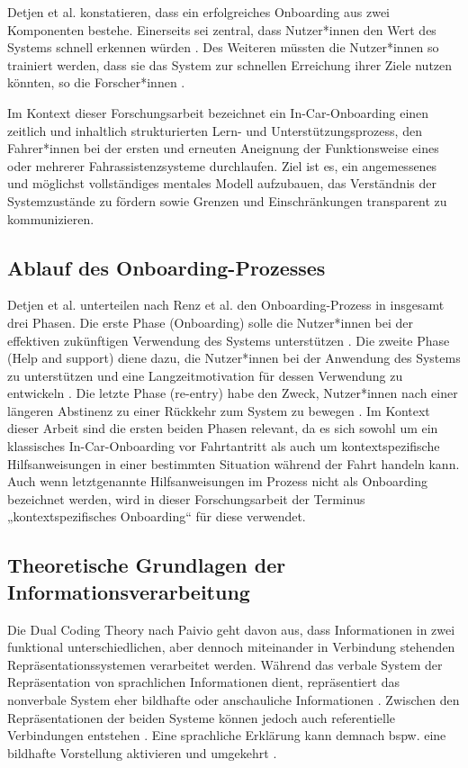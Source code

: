 Detjen et al. \cite{detjen2021supporting} konstatieren, dass ein erfolgreiches Onboarding aus zwei Komponenten bestehe. Einerseits sei zentral, dass Nutzer*innen den Wert des Systems schnell erkennen würden \cite{detjen2021supporting}. Des Weiteren müssten die Nutzer*innen so trainiert werden, dass sie das System zur schnellen Erreichung ihrer Ziele nutzen könnten, so die Forscher*innen \cite{detjen2021supporting}. 

Im Kontext dieser Forschungsarbeit bezeichnet ein In-Car-Onboarding einen zeitlich und inhaltlich strukturierten Lern- und Unterstützungsprozess, den Fahrer*innen bei der ersten und erneuten Aneignung der Funktionsweise eines oder mehrerer Fahrassistenzsysteme durchlaufen. Ziel ist es, ein angemessenes und möglichst vollständiges mentales Modell aufzubauen, das Verständnis der Systemzustände zu fördern sowie Grenzen und Einschränkungen transparent zu kommunizieren. 

\subsection{Ablauf des Onboarding-Prozesses}
\label{subsec:ablauf_onboarding}
Detjen et al. \cite{detjen2021supporting} unterteilen nach Renz et al. \cite{renz2014improving} den Onboarding-Prozess in insgesamt drei Phasen. Die erste Phase (Onboarding) solle die Nutzer*innen bei der effektiven zukünftigen Verwendung des Systems unterstützen \cite{detjen2021supporting}. Die zweite Phase (Help and support) diene dazu, die Nutzer*innen bei der Anwendung des Systems zu unterstützen und eine Langzeitmotivation für dessen Verwendung zu entwickeln \cite{detjen2021supporting}. Die letzte Phase (re-entry) habe den Zweck, Nutzer*innen nach einer längeren Abstinenz zu einer Rückkehr zum System zu bewegen \cite{detjen2021supporting}. Im Kontext dieser Arbeit sind die ersten beiden Phasen relevant, da es sich sowohl um ein klassisches In-Car-Onboarding vor Fahrtantritt als auch um kontextspezifische Hilfsanweisungen in einer bestimmten Situation während der Fahrt handeln kann. Auch wenn letztgenannte Hilfsanweisungen im Prozess nicht als Onboarding bezeichnet werden, wird in dieser Forschungsarbeit der Terminus „kontextspezifisches Onboarding“ für diese verwendet.

\subsection{Theoretische Grundlagen der Informationsverarbeitung}
\label{subsec:grundlagen_Informationsvermittlung}
Die Dual Coding Theory nach Paivio \cite{paivio1991dual} geht davon aus, dass Informationen in zwei funktional unterschiedlichen, aber dennoch miteinander in Verbindung stehenden Repräsentationssystemen verarbeitet werden. Während das verbale System der Repräsentation von sprachlichen Informationen dient, repräsentiert das nonverbale System eher bildhafte oder anschauliche Informationen \cite{paivio1991dual}. Zwischen den Repräsentationen der beiden Systeme können jedoch auch referentielle Verbindungen entstehen \cite{paivio1991dual}. Eine sprachliche Erklärung kann demnach bspw. eine bildhafte Vorstellung aktivieren und umgekehrt \cite{paivio1991dual}. 

